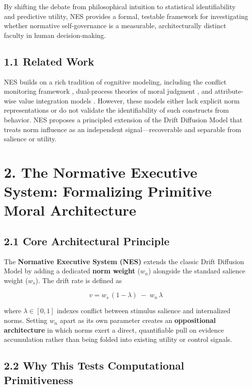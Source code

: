 \documentclass[
  11pt,
]{article}
\begin{document}
By shifting the debate from philosophical intuition to statistical
identifiability and predictive utility, NES provides a formal, testable
framework for investigating whether normative self-governance is a
measurable, architecturally distinct faculty in human decision-making.

\subsection{1.1 Related Work}\label{related-work}

NES builds on a rich tradition of cognitive modeling, including the
conflict monitoring framework
\autocite{Botvinick2001ConflictMonitoring}, dual-process theories of
moral judgment \autocite{Greene2001fMRI}, and attribute-wise value
integration models \autocite{Hare2009SelfControl}. However, these models
either lack explicit norm representations or do not validate the
identifiability of such constructs from behavior. NES proposes a
principled extension of the Drift Diffusion Model that treats norm
influence as an independent signal---recoverable and separable from
salience or utility.

\section{2. The Normative Executive System: Formalizing Primitive Moral
Architecture}\label{the-normative-executive-system-formalizing-primitive-moral-architecture}

\subsection{2.1 Core Architectural
Principle}\label{core-architectural-principle}

The \textbf{Normative Executive System (NES)} extends the classic Drift
Diffusion Model by adding a dedicated \textbf{norm weight} (\(w_n\))
alongside the standard salience weight (\(w_s\)). The drift rate is
defined as

\[
v = w_s\,(1 - \lambda)\;-\;w_n\,\lambda
\]

where \(\lambda\in[0,1]\) indexes conflict between stimulus salience and
internalized norms. Setting \(w_n\) apart as its own parameter creates
an \textbf{oppositional architecture} in which norms exert a direct,
quantifiable pull on evidence accumulation rather than being folded into
existing utility or control signals.

\subsection{2.2 Why This Tests Computational
Primitiveness}\label{why-this-tests-computational-primitiveness}
\end{document}
